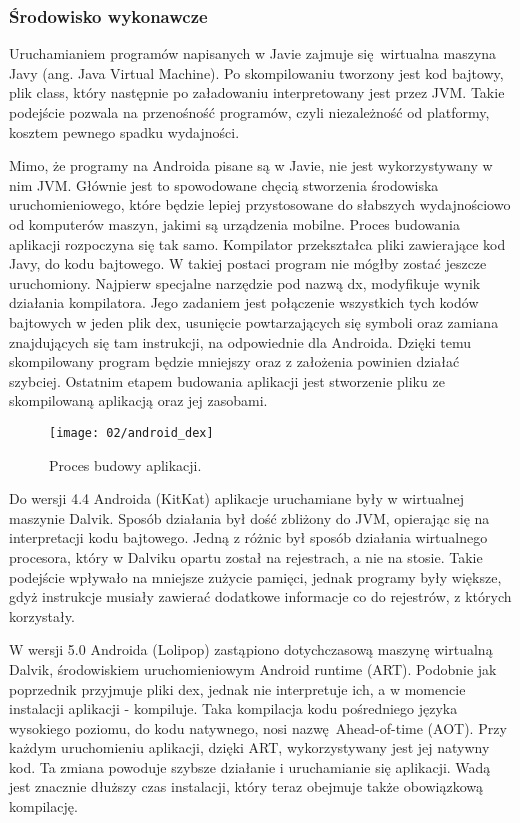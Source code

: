 \subsubsection*{Środowisko wykonawcze}
Uruchamianiem programów napisanych w Javie zajmuje się wirtualna maszyna Javy (ang. Java Virtual Machine). Po skompilowaniu tworzony jest kod bajtowy, plik class, który następnie po załadowaniu interpretowany jest przez JVM. Takie podejście pozwala na przenośność programów, czyli niezależność od platformy, kosztem pewnego spadku wydajności.

Mimo, że programy na Androida pisane są w Javie, nie jest wykorzystywany w nim JVM. Głównie jest to spowodowane chęcią stworzenia środowiska uruchomieniowego, które będzie lepiej przystosowane do słabszych wydajnościowo od komputerów maszyn, jakimi są urządzenia mobilne. Proces budowania aplikacji rozpoczyna się tak samo. Kompilator przekształca pliki zawierające kod Javy, do kodu bajtowego. W takiej postaci program nie mógłby zostać jeszcze uruchomiony. Najpierw specjalne narzędzie pod nazwą dx, modyfikuje wynik działania kompilatora. Jego zadaniem jest połączenie wszystkich tych kodów bajtowych w jeden plik dex, usunięcie powtarzających się symboli oraz zamiana znajdujących się tam instrukcji, na odpowiednie dla Androida. Dzięki temu skompilowany program będzie mniejszy oraz z założenia powinien działać szybciej. Ostatnim etapem budowania aplikacji jest stworzenie pliku ze skompilowaną aplikacją oraz jej zasobami.

\begin{figure}[h]
	\begin{center}
		\texttt{[image: 02/android\_dex]}
	\end{center}
	\caption{Proces budowy aplikacji.}
	\vspace{-0.5cm}
\end{figure}

Do wersji 4.4 Androida (KitKat) aplikacje uruchamiane były w wirtualnej maszynie Dalvik. Sposób działania był dość zbliżony do JVM, opierając się na interpretacji kodu bajtowego. Jedną z różnic był sposób działania wirtualnego procesora, który w Dalviku opartu został na rejestrach, a nie na stosie. Takie podejście wpływało na mniejsze zużycie pamięci, jednak programy były większe, gdyż instrukcje musiały zawierać dodatkowe informacje co do rejestrów, z których korzystały.

W wersji 5.0 Androida (Lolipop) zastąpiono dotychczasową maszynę wirtualną Dalvik, środowiskiem uruchomieniowym Android runtime (ART). Podobnie jak poprzednik przyjmuje pliki dex, jednak nie interpretuje ich, a w momencie instalacji aplikacji - kompiluje. Taka kompilacja kodu pośredniego języka wysokiego poziomu, do kodu natywnego, nosi nazwę Ahead-of-time (AOT). Przy każdym uruchomieniu aplikacji, dzięki ART, wykorzystywany jest jej natywny kod. Ta zmiana powoduje szybsze działanie i uruchamianie się aplikacji. Wadą jest znacznie dłuższy czas instalacji, który teraz obejmuje także obowiązkową kompilację.

